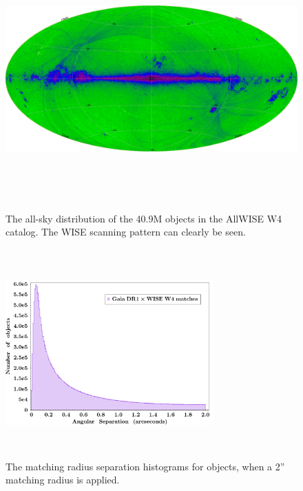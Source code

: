 \documentclass[11pt,a4paper]{article}
\begin{document}
\begin{figure}
    \includegraphics[height=10.0cm,width=16.0cm]
    {../../Gaia/plots/WISE_W4_DetBitge8_Aittoff_Galactic.png}
    \caption[The all-sky distribution of the 40.9M objects in the AllWISE W4 catalog.]
    {The all-sky distribution of the 40.9M objects in the AllWISE W4 catalog.
    The WISE scanning pattern can clearly be seen.}
    \label{fig:fig1}
\end{figure}


\begin{figure}
   \centering
  \includegraphics[height=8.0cm,width=8.0cm]
 {../../Gaia/plots/GaiaDR1xWISEW4_2as_histo.png}
    \caption[]
    {The matching radius separation histograms for objects, when a 2'' matching radius is applied.}
    \label{fig:fig2}
\end{figure}
\end{document}
